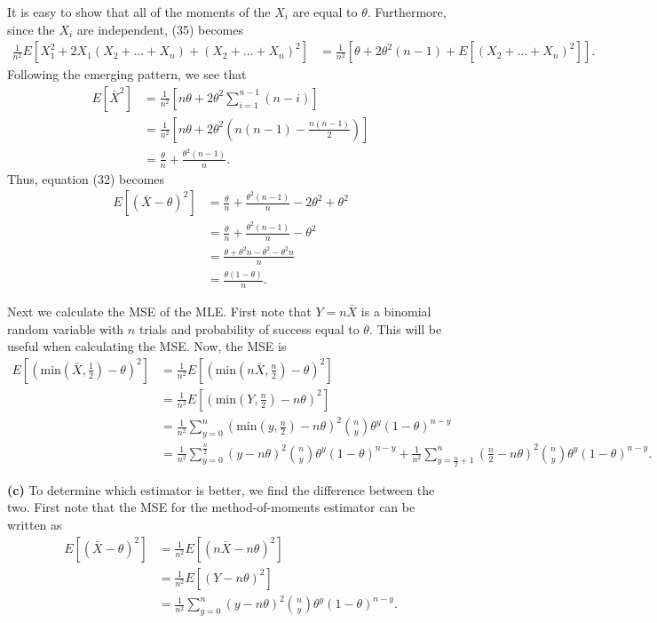 \documentclass{article}
\begin{document}
\noindent It is easy to show that all of the moments of the $X_i$ are equal to $\theta$. Furthermore, since the $X_i$ are independent, (35) becomes
\pagebreak
\begin{align}
\frac{1}{n^2}E[X_1^2 + 2X_1(X_2+\ldots+ X_n) + (X_2 + \ldots + X_n)^2] &= \frac{1}{n^2}\left[\theta + 2\theta^2(n-1) + E[(X_2 + \ldots + X_n)^2]\right].
\end{align}
\noindent Following the emerging pattern, we see that 
\begin{align}
E[\bar{X}^2] &= \frac{1}{n^2}\left[ n\theta +2\theta^2\sum\limits_{i=1}^{n-1}(n-i) \right] \\
&= \frac{1}{n^2}\left[n\theta + 2\theta^2\left( n(n-1) - \frac{n(n-1)}{2}\right)\right] \\
&= \frac{\theta}{n} + \frac{\theta^2(n-1)}{n}.
\end{align}
\noindent Thus, equation (32) becomes 
\begin{align}
E[(\bar{X}-\theta)^2] &= \frac{\theta}{n} + \frac{\theta^2(n-1)}{n} - 2\theta^2 + \theta^2 \\
&= \frac{\theta}{n} + \frac{\theta^2(n-1)}{n} - \theta^2 \\
&= \frac{\theta +\theta^2n-\theta^2 -\theta^2n}{n} \\
&= \frac{\theta(1-\theta)}{n}.
\end{align}

\noindent Next we calculate the MSE of the MLE.  First note that $Y=n\bar{X}$ is a binomial random variable with $n$ trials and probability of success equal to $\theta$. This will be useful when calculating the MSE.  Now, the MSE is
\begin{align}
E\left[\left(\text{min}\left(\bar{X}, \frac{1}{2}\right) - \theta\right)^2\right] &= \frac{1}{n^2}E\left[\left(\text{min}\left(n\bar{X}, \frac{n}{2}\right) - \theta\right)^2\right] \\
&= \frac{1}{n^2}E\left[\left(\text{min}\left(Y, \frac{n}{2}\right) - n\theta\right)^2\right] \\
&= \frac{1}{n^2}\sum\limits_{y=0}^n\left(\text{min}\left(y, \frac{n}{2}\right) - n\theta\right)^2{n\choose y}\theta^y(1-\theta)^{n-y} \\
&= \frac{1}{n^2}\sum\limits_{y=0}^{\frac{n}{2}}(y- n\theta)^2{n\choose y}\theta^y(1-\theta)^{n-y} + \frac{1}{n^2}\sum\limits_{y=\frac{n}{2}+1}^n\left(\frac{n}{2} - n\theta\right)^2{n \choose y}\theta^y(1-\theta)^{n-y}.
\end{align}

\noindent\textbf{(c)} To determine which estimator is better, we find the difference between the two.  First note that the MSE for the method-of-moments estimator can be written as
\begin{align}
E[(\bar{X}-\theta)^2] &= \frac{1}{n^2}E[(n\bar{X}-n\theta)^2] \\
&= \frac{1}{n^2}E[(Y-n\theta)^2] \\
&= \frac{1}{n^2}\sum\limits_{y=0}^n (y-n\theta)^2{n\choose y}\theta^y(1-\theta)^{n-y}.
\end{align}
\end{document}
